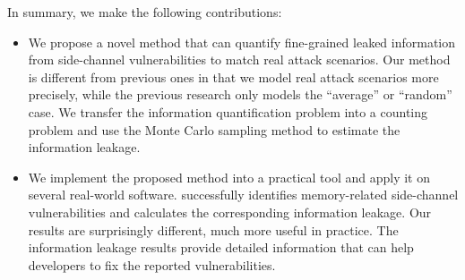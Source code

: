 In summary, we make the following contributions:

\begin{itemize}
      \item We propose a novel method that can quantify fine-grained leaked
            information from side-channel vulnerabilities to match real attack
            scenarios. Our method is different from previous ones in that we
            model real attack scenarios more precisely, while the previous
            research only models the ``average'' or ``random'' case. 
            We transfer the information quantification problem into a counting
            problem and use the Monte Carlo sampling method to estimate the
            information leakage.


      \item We implement the proposed method into a practical tool and apply it
            on several real-world software. \tool{} successfully identifies
            memory-related side-channel vulnerabilities and calculates the
            corresponding information leakage. 
            Our results are surprisingly different, much more useful in practice.
            The information leakage results
            provide detailed information that can help developers to fix the
            reported vulnerabilities.
\end{itemize}
